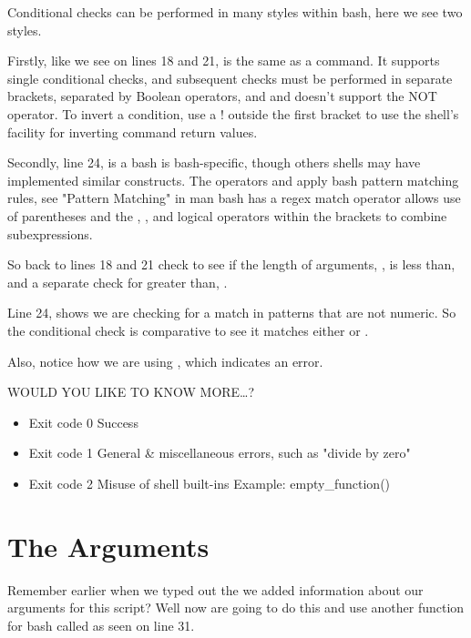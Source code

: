 \documentclass{article}
\begin{document}
\inputminted[frame=single,firstline=17, lastline=27,linenos]{bash}{./systemStats.sh}

Conditional checks can be performed in many styles within bash, here we see two styles.

Firstly, like we see on lines 18 and 21, \code{[ ]} is the same as a   command. It supports single conditional checks, and subsequent checks must be performed in separate brackets, separated by Boolean operators, \code{\& \&} and \code{||} and doesn't support the \code{!} NOT operator. To invert a condition, use a ! outside the first bracket to use the shell's facility for inverting command return values.

Secondly, line 24, \code{[[ ]]} is a bash is bash-specific, though others shells may have implemented similar constructs. The operators \code{==} and \code{!=} apply bash pattern matching rules, see "Pattern Matching" in man bash has a \code{=\textasciitilde} regex match operator allows use of parentheses and the \code{!}, \code{\&\&}, and \code{||} logical operators within the brackets to combine subexpressions.

So back to lines 18 and 21 check to see if the length of arguments, \code{\$\#}, is less than,  and a separate check for greater than, .

Line 24, shows we are checking for a match in patterns that are not numeric. So the conditional check is comparative to see it  matches either  or .

Also, notice how we are using , which indicates an error. 

\begin{shaded}
\textbf{\faSpaceShuttle} \hspace{1em} WOULD YOU LIKE TO KNOW MORE\ldots ?
\begin{itemize}
    \item Exit code 0  \hspace{3em}      Success
    \item Exit code 1  \hspace{3em}      General \& miscellaneous errors, such as "divide by zero" 
    \item Exit code 2    \hspace{3em}    Misuse of shell built-ins Example: empty\_function() {}
\end{itemize}
\end{shaded}

\section{The Arguments}
\label{sec:theArguments}
Remember earlier when we typed out the  we added information about our arguments for this script? Well now are going to do this and use another  function for bash called  as seen on line 31.
\end{document}
